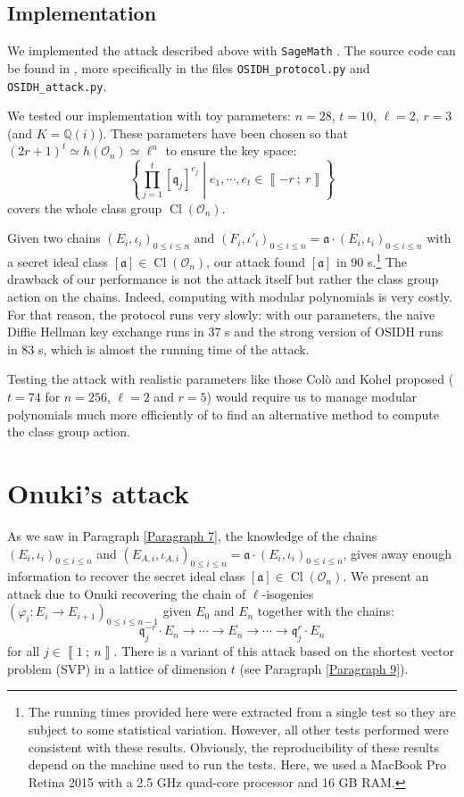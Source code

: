 \documentclass[a4paper,10pt,notitlepage]{report}
\theoremstyle{definition}
\theoremstyle{plain}
\theoremstyle{definition}
\newcommand{\Q}{\mathbb{Q}}
\newcommand{\mO}{\mathcal{O}}
\renewcommand{\i}[2]{\left\llbracket #1~;~#2\right\rrbracket}
\renewcommand{\(}{\left(}
\renewcommand{\)}{\right)}
\newcommand{\mf}[1]{\mathfrak{#1}}
\DeclareMathOperator{\Cl}{Cl}
\begin{document}
\subsection{Implementation}\label{Paragraph 18}

We implemented the attack described above with \verb?SageMath? \cite{sagemath}.  The source code can be found in \cite{MyGithub}, more specifically in the files \verb?OSIDH_protocol.py? and \verb?OSIDH_attack.py?.

We tested our implementation with toy parameters: $n=28$, $t=10$,
$\ell=2$, $r=3$ (and $K=\Q(i)$). These parameters have been chosen so that $(2r+1)^t\simeq h(\mO_n)\simeq \ell^n$ to ensure the key space:
\[\left\{\prod_{j=1}^t[\mf{q}_j]^{e_j}\middle| e_1, \cdots, e_t\in\i{-r}{r}\right\}\]
covers the whole class group $\Cl(\mO_n)$.

Given two chains $(E_i,\iota_i)_{0\leq i\leq n}$ and $(F_i,\iota'_i)_{0\leq i\leq n}=\mf{a}\cdot(E_i,\iota_i)_{0\leq i\leq n}$ with a secret ideal class $[\mf{a}]\in\Cl(\mO_n)$, our attack found $[\mf{a}]$ in 90 s.\footnote{The running times provided here were extracted from a single test so they are subject to some statistical variation. However, all other tests performed were consistent with these results.  Obviously, the reproducibility of these results depend on the machine used to run the tests.  Here, we used a MacBook Pro Retina 2015 with a 2.5 GHz quad-core processor and 16 GB RAM.} The drawback of our performance is not the attack itself but rather the class group action on the chains. Indeed, computing with modular polynomials is very costly.  For that reason, the protocol runs very slowly: with our parameters, the naive Diffie Hellman key exchange runs in 37 s and the strong version of OSIDH runs in 83 s, which is almost the running time of the attack. 

Testing the attack with realistic parameters like those Col\`{o} and Kohel proposed ($t=74$ for $n=256$, $\ell=2$ and $r=5$) would require us to manage modular polynomials much more efficiently of to find an alternative method to compute the class group action.

\section{Onuki's attack}\label{Paragraph 22}

As we saw in Paragraph \ref{Paragraph 7}, the knowledge of the chains $(E_i,\iota_i)_{0\leq i\leq n}$ and $(E_{A,i},\iota_{A,i})_{0\leq i\leq n}=\mf{a}\cdot (E_i,\iota_i)_{0\leq i\leq n}$, gives away enough information to recover the secret ideal class $[\mf{a}]\in\Cl(\mO_n)$.  We present an attack due to Onuki \cite[§ 6.3]{Onuki} recovering the chain of $\ell$-isogenies $(\varphi_i : E_i\longrightarrow E_{i+1})_{0\leq i\leq n-1}$  given $E_0$ and $E_n$ together with the chains:
\[\mf{q}_j^{-r}\cdot E_n\longrightarrow \cdots \longrightarrow E_n\longrightarrow \cdots\longrightarrow \mf{q}_j^{r}\cdot E_n\]
for all $j\in\i{1}{n}$. There is a variant of this attack based on the shortest vector problem (SVP) in a lattice of dimension $t$ (see Paragraph \ref{Paragraph 9}).
\end{document}
